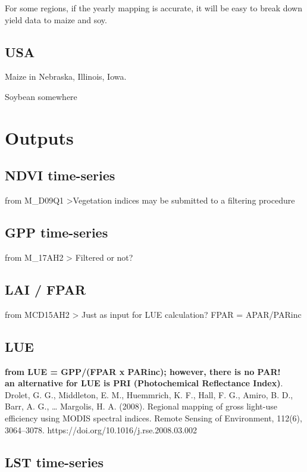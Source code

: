 \documentclass[a4paper,12pt,single,pdftex]{scrartcl}
\begin{document}
For some regions, if the yearly mapping is accurate, it will be easy to break down yield data to maize and soy.\subsection{USA}


Maize in Nebraska, Illinois, Iowa.

Soybean somewhere\section{Outputs}
\subsection{NDVI time-series}


from M\_D09Q1 >Vegetation indices may be submitted to a filtering procedure\subsection{GPP time-series}


from M\_17AH2 > Filtered or not?\subsection{LAI / FPAR}


from MCD15AH2 > Just as input for LUE calculation? FPAR = APAR/PARinc\subsection{LUE}

    
      {\bf from LUE = GPP/(FPAR x PARinc); however, there is no PAR! }
    \\

    
      {\bf an alternative for LUE is PRI (Photochemical Reflectance Index)}.
    \\

    
      Drolet, G. G., Middleton, E. M., Huemmrich, K. F., Hall, F. G., Amiro, B. D., Barr, A. G., … Margolis, H. A. (2008). Regional mapping of gross light-use efficiency using MODIS spectral indices. Remote Sensing of Environment, 112(6), 3064–3078. https://doi.org/10.1016/j.rse.2008.03.002
    \\

  \subsection{LST time-series}
\end{document}
